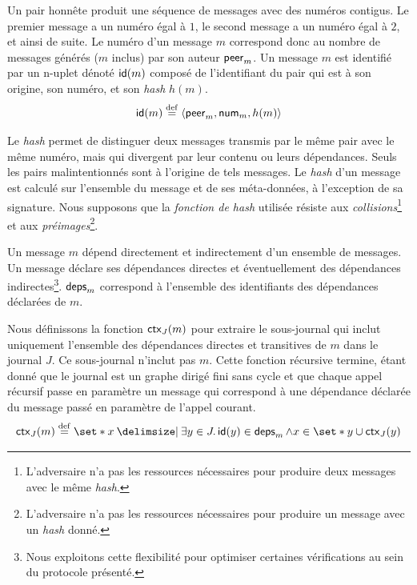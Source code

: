 Un pair honnête produit une séquence de messages avec des numéros contigus.
Le premier message a un numéro égal à $1$, le second message a un numéro égal à $2$, et ainsi de suite.
Le numéro d'un message $m$ correspond donc au nombre de messages générés ($m$ inclus) par son auteur $\trm{peer}_m$.
Un message $m$ est identifié par un n-uplet dénoté $\trm{id}(m)$ composé de l'identifiant du pair qui est à son origine, son numéro, et son \emph{hash} $h(m)$.
%
\begin{equation}
    \trm{id}(m) \defeq \tuple*{\trm{peer}_m, \trm{num}_m, h(m)}
\end{equation}

Le \emph{hash} permet de distinguer deux messages transmis par le même pair avec le même numéro, mais qui divergent par leur contenu ou leurs dépendances.
Seuls les pairs malintentionnés sont à l'origine de tels messages.
Le \emph{hash} d'un message est calculé sur l'ensemble du message et de ses méta-données, à l'exception de sa signature.
Nous supposons que la \emph{fonction de hash} utilisée résiste aux \emph{collisions}\footnote{L'adversaire n'a pas les ressources nécessaires pour produire deux messages avec le même \emph{hash}.} et aux \emph{préimages}\footnote{L'adversaire n'a pas les ressources nécessaires pour produire un message avec un \emph{hash} donné.}.

Un message $m$ dépend directement et indirectement d'un ensemble de messages.
Un message déclare ses dépendances directes et éventuellement des dépendances indirectes\footnote{Nous exploitons cette flexibilité pour optimiser certaines vérifications au sein du protocole présenté.}.
$\trm{deps}_m$ correspond à l'ensemble des identifiants des dépendances déclarées de $m$.

Nous définissons la fonction $\trm{ctx}_J(m)$ pour extraire le sous-journal qui inclut uniquement l'ensemble des dépendances directes et transitives de $m$ dans le journal $J$.
Ce sous-journal n'inclut pas $m$.
Cette fonction récursive termine, étant donné que le journal est un graphe dirigé fini sans cycle et que chaque appel récursif passe en paramètre un message qui correspond à une dépendance déclarée du message passé en paramètre de l'appel courant.
%
\begin{equation}
    \trm{ctx}_J(m) \defeq \set*{ x \given \exists y \in J \qsep \trm{id}(y) \in \trm{deps}_m \land x \in \set*{y} \cup \trm{ctx}_J(y)}
\end{equation}

